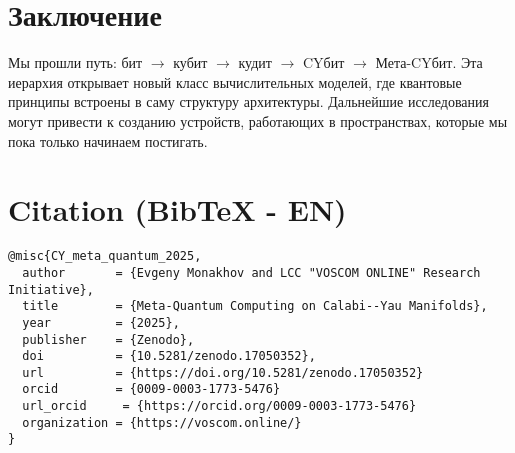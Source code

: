\documentclass[12pt,a4paper]{article}
\begin{document}
\section*{Заключение}
Мы прошли путь: бит $\to$ кубит $\to$ кудит $\to$ CYбит $\to$ Мета-CYбит.  
Эта иерархия открывает новый класс вычислительных моделей, 
где квантовые принципы встроены в саму структуру архитектуры. 
Дальнейшие исследования могут привести к созданию устройств, 
работающих в пространствах, которые мы пока только начинаем постигать.

\section*{Citation (BibTeX - EN)}
\begin{verbatim}
@misc{CY_meta_quantum_2025,
  author       = {Evgeny Monakhov and LCC "VOSCOM ONLINE" Research Initiative},
  title        = {Meta-Quantum Computing on Calabi--Yau Manifolds},
  year         = {2025},
  publisher    = {Zenodo},
  doi          = {10.5281/zenodo.17050352},
  url          = {https://doi.org/10.5281/zenodo.17050352}
  orcid		   = {0009-0003-1773-5476}
  url_orcid     = {https://orcid.org/0009-0003-1773-5476}
  organization = {https://voscom.online/}
}
\end{verbatim}
\end{document}
